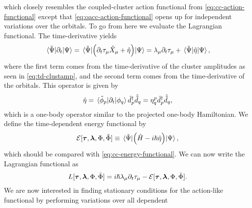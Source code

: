         which closely resembles the coupled-cluster action functional from
        \autoref{eq:cc-action-functional} except that
        \autoref{eq:oacc-action-functional} opens up for independent
        variations over the orbitals.
        To go from here we evaluate the Lagrangian functional.
        The time-derivative yields
        \begin{align}
            \mel*{\tilde{\Psi}}{\partial_t}{\Psi}
            =
            \mel*{\tilde{\Psi}}{
                \left( 
                    \partial_t \tau_{\mu}\hat{X}_{\mu}
                    +
                    \hat{\eta}
                 \right)
            }{\Psi}
            =
            \lambda_{\mu}\partial_t\tau_{\mu}
            + \mel*{\tilde{\Psi}}{\hat{\eta}}{\Psi},
        \end{align}
        where the first term comes from the time-derivative of the cluster
        amplitudes as seen in \autoref{eq:td-clustamp}, and the second term
        comes from the time-derivative of the orbitals.
        This operator is given by
        \begin{align}
            \hat{\eta}
            = \mel*{\tilde{\phi}_p}{\partial_t}{\phi_q}
            \hat{d}^{\dagger}_{p}\hat{\tilde{d}}_{q}
            = \eta^{p}_{q}\hat{d}^{\dagger}_{p}\hat{\tilde{d}}_{q},
        \end{align}
        which is a one-body operator similar to the projected one-body
        Hamiltonian.
        We define the time-dependent energy functional by
        \begin{align}
            \mathcal{E}[
                \boldsymbol{\tau}, \boldsymbol{\lambda}, \Phi, \tilde{\Phi}
            ]
            \equiv \mel*{\tilde{\Psi}}{
                \left( 
                    \hat{H} - i\hslash\hat{\eta}
                 \right)
            }{\Psi},
        \end{align}
        which should be compared with \autoref{eq:cc-energy-functional}.
        We can now write the Lagrangian functional as
        \begin{align}
            L[\boldsymbol{\tau}, \boldsymbol{\lambda}, \Phi, \tilde{\Phi}]
            =
            i\hslash\lambda_{\mu}\partial_t\tau_{\mu}
            -
            \mathcal{E}[
                \boldsymbol{\tau}, \boldsymbol{\lambda}, \Phi, \tilde{\Phi}
            ].
            \label{eq:oatdcc-lagrangian}
        \end{align}
        We are now interested in finding stationary conditions for the
        action-like functional by performing variations over all dependent

